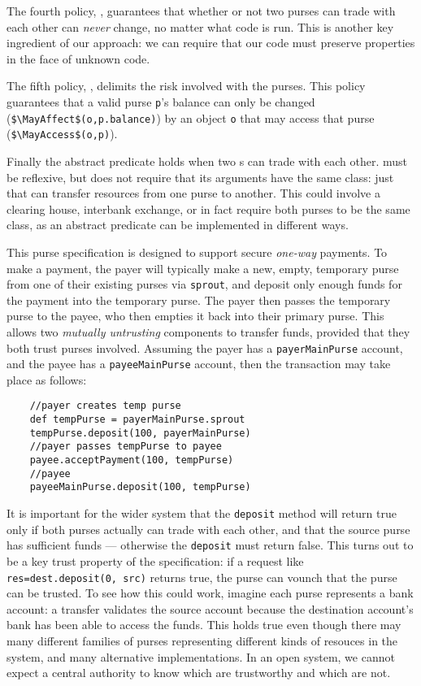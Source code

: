 The fourth policy, , guarantees that
whether or not two purses can trade with each other can \textit{never}
change, no matter what code is run.  This is another key ingredient of
our approach: we can require that our code must preserve
properties in the face of unknown code.


The fifth policy, ,
delimits the risk involved with the purses. This policy
guarantees that
 a valid purse \lstinline+p+'s balance can only be changed
(\lstinline+$\MayAffect$(o,p.balance)+)
by an object \lstinline{o}
that may access that purse
(\lstinline+$\MayAccess$(o,p)+).


Finally the abstract predicate  holds when two
s can trade with each other.   must be
reflexive, but does not require that its arguments have the same
class: just that  can transfer resources from one purse
to another. This could involve a clearing house, interbank exchange,
or in fact require both purses to be the same class, as an abstract
predicate can be implemented in different ways.

This purse specification is designed to support secure
\textit{one-way} payments.  To make a payment, the payer will
typically make a new, empty, temporary purse from one of their
existing purses via \lstinline+sprout+, and deposit only enough funds
for the payment into the temporary purse.  The payer then passes the
temporary purse to the payee, who then empties it back into their
primary purse.  This allows two \textit{mutually untrusting}
components to transfer funds, provided that they both trust
purses involved. Assuming the payer has a \lstinline+payerMainPurse+
account, and the payee has a \lstinline+payeeMainPurse+ account, then
the transaction may take place as follows:

\label{s-payment}
\begin{lstlisting}
    //payer creates temp purse
    def tempPurse = payerMainPurse.sprout
    tempPurse.deposit(100, payerMainPurse)
    //payer passes tempPurse to payee
    payee.acceptPayment(100, tempPurse)
    //payee
    payeeMainPurse.deposit(100, tempPurse)
\end{lstlisting}

It is important for the wider system that the \lstinline+deposit+
method will return true only if both purses actually can trade with
each other, and that the source purse has sufficient funds ---
otherwise the \lstinline+deposit+ must return false.
This turns out to be a
 key trust property of the
 specification: if a request like
%
\lstinline+res=dest.deposit(0, src)+
%
returns true, the  purse can vounch that the  purse
can be trusted.  To see how this could work, imagine each purse
represents a bank account: a transfer validates the source account
because the destination account's bank has been able to access the
funds.  This holds true even though there may many different families
of purses representing different kinds of resouces in the system, and
many alternative implementations. In an open system, we cannot expect
a central authority to know which are trustworthy and which are not.






